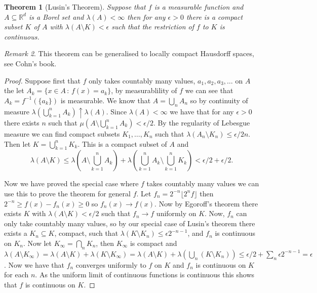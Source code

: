 \documentclass[11pt]{article}
\newtheorem{thm}{Theorem}[section]
\theoremstyle{definition}
\theoremstyle{remark}
\newtheorem{remark}[thm]{Remark}
\begin{document}
\begin{thm}[Lusin's Theorem]
Suppose that $f$ is a measurable function and $A \subseteq \mathbb{R}^d$ is a Borel set and $\lambda(A) < \infty$ then for any $\epsilon >0$ there is a compact subset $K$ of $A$ with $\lambda(A \setminus K) < \epsilon$ such that the restriction of $f$ to $K$ is continuous. 
\end{thm}
\begin{remark}
This theorem can be generalised to locally compact Hausdorff spaces, see Cohn's book.
\end{remark}
\begin{proof}
Suppose first that $f$ only takes countably many values, $a_1, a_2, a_3, \dots$ on $A$ the let $A_k = \{ x \in A \,:\, f(x) = a_k\}$, by measurablility of $f$ we can see that $A_k = f^{-1}(\{a_k\})$ is measurable. We know that $A = \bigcup_n A_n$ so by continuity of measure $\lambda(\bigcup_{k=1}^n A_k) \uparrow \lambda(A)$. Since $\lambda(A) < \infty$ we have that for any $\epsilon >0$ there exists $n$ such that $\mu(A \setminus \bigcup_{k=1}^n A_k) < \epsilon/2$. By the regularity of Lebesgue measure we can find compact subsets $K_1, \dots, K_n$ such that $\lambda(A_n \setminus K_n) \leq \epsilon/2n$. Then let $K = \bigcup_{k=1}^n K_k$. This is a compact subset of $A$ and
\[ \lambda(A \setminus K) \leq \lambda(A\setminus \bigcup_{k=1}^n A_k) + \lambda(\bigcup_{k=1}^n A_k \setminus \bigcup_{k=1}^n K_k ) < \epsilon/2 + \epsilon/2. \]  

Now we have proved the special case where $f$ takes countably many values we can use this to prove the theorem for general $f$. Let $f_n = 2^{-n} \lfloor 2^n f \rfloor$ then $2^{-n} \geq f(x)-f_n(x) \geq 0$ so $f_n(x) \rightarrow f(x)$. Now by Egoroff's theorem there exists $K$ with $\lambda(A \setminus K) < \epsilon/2$ such that $f_n \rightarrow f$ uniformly on $K$. Now, $f_n$ can only take countably many values, so by our special case of Lusin's theorem there exists a $K_n \subseteq K$, compact, such that $\lambda(K \setminus K_n) \leq \epsilon 2^{-n-1}$, and $f_n$ is continuous on $K_n$. Now let $K_\infty = \bigcap_n K_n$, then $K_\infty$ is compact and $\lambda(A \setminus K_\infty) = \lambda(A \setminus K) + \lambda(K \setminus K_\infty) = \lambda(A \setminus K) +  \lambda (\bigcup_n(K \setminus K_n)) \leq \epsilon/2 + \sum_n \epsilon 2^{-n-1} = \epsilon$. Now we have that $f_n$ converges uniformly to $f$ on $K$ and $f_n$ is continuous on $K$ for each $n$. As the uniform limit of continuous functions is continuous this shows that $f$ is continuous on $K$. 
\end{proof}
\end{document}
